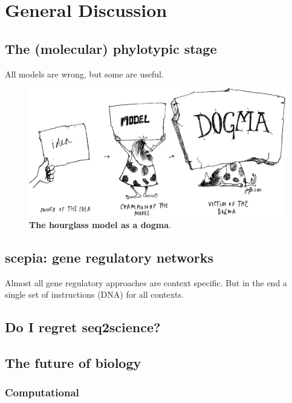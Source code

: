\chapter{General Discussion}\thumbforchapter
\newpage

\section{The (molecular) phylotypic stage}

All models are wrong, but some are useful. 

\begin{figure}[H]
    \includegraphics[width=\linewidth]{ch.discussion/imgs/dogma.png}
    \caption{\textbf{The hourglass model as a dogma}. \cite{Caveman2000}}
    \label{fig:dogma}
\end{figure}

\section{scepia: gene regulatory networks}

Almost all gene regulatory approaches are context specific. But in the end a single set of instructions (DNA) for all contexts.

\section{Do I regret seq2science?}

\section{The future of biology}

\subsection{Computational}




